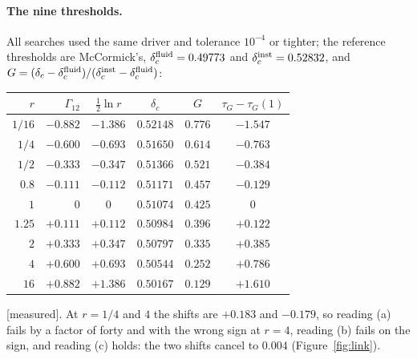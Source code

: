 \documentclass[11pt]{article}
\newcommand{\grade}[1]{\textsf{\small[#1]}}
\begin{document}
\paragraph{The nine thresholds.} All searches used the same driver and tolerance $10^{-4}$ or tighter; the reference thresholds are McCormick's, $\delta_c^{\rm fluid}=0.49773$ and $\delta_c^{\rm inst}=0.52832$, and $G=(\delta_c-\delta_c^{\rm fluid})/(\delta_c^{\rm inst}-\delta_c^{\rm fluid})$:
\begin{center}\begin{tabular}{rrcccc}\toprule
$r$ & $\Gamma_{12}$ & $\tfrac12\ln r$ & $\delta_c$ & $G$ & $\tau_G-\tau_G(1)$\\\midrule
$1/16$ & $-0.882$ & $-1.386$ & $0.52148$ & $0.776$ & $-1.547$\\
$1/4$ & $-0.600$ & $-0.693$ & $0.51650$ & $0.614$ & $-0.763$\\
$1/2$ & $-0.333$ & $-0.347$ & $0.51366$ & $0.521$ & $-0.384$\\
$0.8$ & $-0.111$ & $-0.112$ & $0.51171$ & $0.457$ & $-0.129$\\
$1$ & $0$ & $0$ & $0.51074$ & $0.425$ & $0$\\
$1.25$ & $+0.111$ & $+0.112$ & $0.50984$ & $0.396$ & $+0.122$\\
$2$ & $+0.333$ & $+0.347$ & $0.50797$ & $0.335$ & $+0.385$\\
$4$ & $+0.600$ & $+0.693$ & $0.50544$ & $0.252$ & $+0.786$\\
$16$ & $+0.882$ & $+1.386$ & $0.50167$ & $0.129$ & $+1.610$\\\bottomrule\end{tabular}\end{center}
\grade{measured}. At $r=1/4$ and $4$ the shifts are $+0.183$ and $-0.179$, so reading (a) fails by a factor of forty and with the wrong sign at $r=4$, reading (b) fails on the sign, and reading (c) holds: the two shifts cancel to $0.004$ (Figure~\ref{fig:link}).
\end{document}
